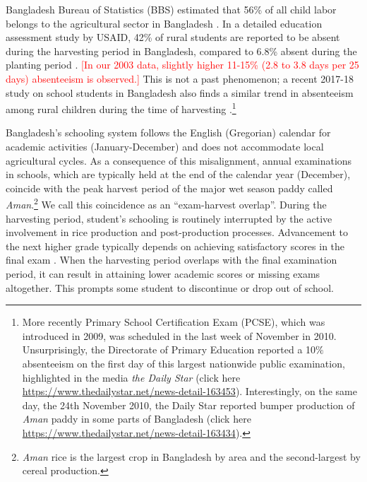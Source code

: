 \documentclass[12pt,letterpaper]{article}\usepackage[margin=1in]{geometry}
\newcommand{\SAdded}[1]{\textcolor{red}{#1}}
\newcommand{\0}{\ensuremath{\mbox{\boldmath $0$}}}
\begin{document}
Bangladesh Bureau of Statistics (BBS) estimated that 56\% of all child labor belongs to the agricultural sector in Bangladesh \citep{bbs2003report}. In a detailed education assessment study by USAID, 42\% of rural students are reported to be absent during the harvesting period in Bangladesh, compared to 6.8\% absent during the planting period \citep[][Table IV.D.9, page 110]{Rahman2004}. \SAdded{[In our 2003 data, slightly higher 11-15\% (2.8 to 3.8 days per 25 days) absenteeism is observed.]} This is not a past phenomenon; a recent 2017-18 study on school students in Bangladesh also finds a similar trend in absenteeism among rural children during the time of harvesting \citep{Fujii2019}.\footnote{More recently Primary School Certification Exam (PCSE), which was introduced in 2009, was scheduled in the last week of November in 2010. Unsurprisingly, the Directorate of Primary Education reported a 10$\%$ absenteeism on the first day of this largest nationwide public examination, highlighted in the media \textit{the Daily Star} (click here \url{https://www.thedailystar.net/news-detail-163453}). Interestingly, on the same day, the 24th November 2010, the Daily Star reported bumper production of \textit{Aman} paddy in some parts of Bangladesh (click here \url{https://www.thedailystar.net/news-detail-163434}). } 

Bangladesh's schooling system follows the English (Gregorian) calendar for academic activities (January-December) and does not accommodate local agricultural cycles. As a consequence of this misalignment, annual examinations in schools, which are typically held at the end of the calendar year (December), coincide with the peak harvest period of the major wet season paddy called \textit{Aman}.\footnote{\textit{Aman} rice is the largest crop in Bangladesh by area and the second-largest by cereal production. } We call this coincidence as an ``exam-harvest overlap''. During the harvesting period, student's schooling is routinely interrupted by the active involvement in rice production and post-production processes. Advancement to the next higher grade typically depends on achieving satisfactory scores in the final exam \citep{ADB2017}. When the harvesting period overlaps with the final examination period, it can result in attaining lower academic scores or missing exams altogether. This prompts some student to discontinue or drop out of school. 
\end{document}
